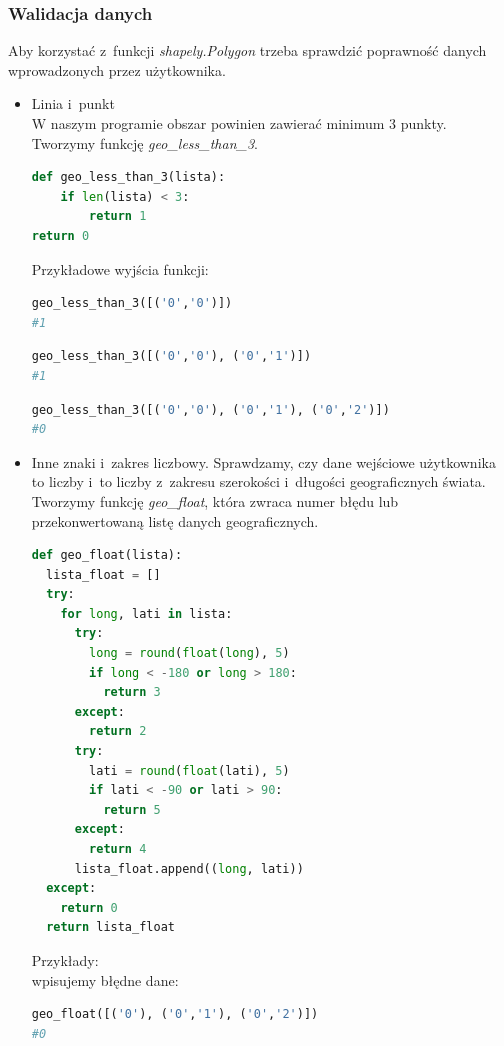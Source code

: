 \documentclass{article}
\begin{document}
\subsubsection*{Walidacja danych}
Aby korzystać z~funkcji \textit{shapely.Polygon} trzeba sprawdzić poprawność danych wprowadzonych przez użytkownika.
\begin{itemize}
\item Linia i~punkt \\ 
W naszym programie obszar powinien zawierać minimum 3 punkty. Tworzymy funkcję \textit{geo\_less\_than\_3}.
\begin{lstlisting}[language=Python, caption=geo\_less\_than\_3]
def geo_less_than_3(lista):
    if len(lista) < 3:
        return 1
return 0
\end{lstlisting}
Przykładowe wyjścia funkcji:
\begin{lstlisting}[language=Python, caption=Za mało danych]
geo_less_than_3([('0','0')])
#1
\end{lstlisting}
\begin{lstlisting}[language=Python, caption=Za mało danych]
geo_less_than_3([('0','0'), ('0','1')])
#1
\end{lstlisting}
\begin{lstlisting}[language=Python, caption=Minimalna liczba danych]
geo_less_than_3([('0','0'), ('0','1'), ('0','2')])
#0
\end{lstlisting}
\item Inne znaki i~zakres liczbowy.
Sprawdzamy, czy dane wejściowe użytkownika to liczby i~to liczby z~zakresu szerokości i~długości geograficznych świata. Tworzymy funkcję \textit{geo\_float}, która zwraca numer błędu lub przekonwertowaną listę danych geograficznych.
\begin{lstlisting}[language=Python, caption=geo\_float]
def geo_float(lista):
  lista_float = []
  try:
    for long, lati in lista:
      try:
        long = round(float(long), 5)
        if long < -180 or long > 180:
          return 3
      except:
        return 2
      try:
        lati = round(float(lati), 5)
        if lati < -90 or lati > 90:
          return 5
      except:
        return 4
      lista_float.append((long, lati))
  except:
    return 0
  return lista_float
\end{lstlisting}
Przykłady: \\
wpisujemy błędne dane: 
\begin{lstlisting}[language=Python, caption=za krótka krotka]
geo_float([('0'), ('0','1'), ('0','2')])
#0
\end{lstlisting}

\end{itemize}
\end{document}
